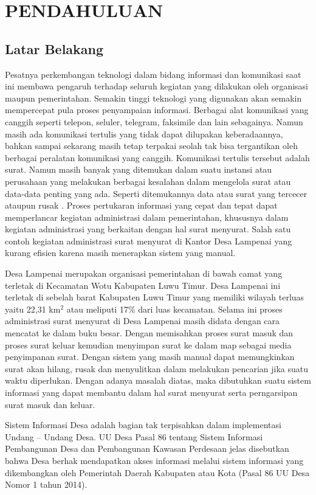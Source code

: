 \chapter{PENDAHULUAN}

\section{Latar Belakang}

Pesatnya perkembangan teknologi dalam bidang informasi dan komunikasi saat ini membawa pengaruh terhadap seluruh kegiatan yang dilakukan oleh organisasi maupun pemerintahan. Semakin tinggi teknologi yang digunakan akan semakin mempercepat pula proses penyampaian informasi. Berbagai alat komunikasi yang canggih seperti telepon, seluler, telegram, faksimile dan lain sebagainya. Namun masih ada komunikasi tertulis yang tidak dapat dilupakan keberadaannya, bahkan sampai sekarang masih tetap terpakai seolah tak bisa tergantikan oleh berbagai peralatan komunikasi yang canggih. Komunikasi tertulis tersebut adalah surat. Namun masih banyak yang ditemukan dalam suatu instansi atau perusahaan yang melakukan berbagai kesalahan dalam mengelola surat atau data-data penting yang ada. Seperti ditemukannya data atau surat yang tercecer ataupun rusak . Proses pertukaran informasi yang cepat dan tepat dapat memperlancar kegiatan administrasi dalam pemerintahan, khususnya dalam kegiatan administrasi yang berkaitan dengan hal surat menyurat. Salah satu contoh kegiatan administrasi surat menyurat di Kantor Desa Lampenai yang kurang efisien karena masih menerapkan sistem yang manual.

Desa Lampenai merupakan organisasi pemerintahan di bawah camat yang terletak di Kecamatan Wotu Kabupaten Luwu Timur. Desa Lampenai ini terletak di sebelah barat Kabupaten Luwu Timur yang memiliki wilayah terluas yaitu 22,31 km$^2$ atau meliputi 17\% dari luas kecamatan. Selama ini proses administrasi surat menyurat di Desa Lampenai masih didata dengan cara mencatat ke dalam buku besar. Dengan memisahkan proses surat masuk dan proses surat keluar kemudian menyimpan surat ke dalam map sebagai media penyimpanan surat. Dengan sistem yang masih manual dapat memungkinkan surat akan hilang, rusak dan menyulitkan dalam melakukan pencarian jika suatu waktu diperlukan. Dengan adanya masalah diatas, maka dibutuhkan suatu sistem informasi yang dapat membantu dalam hal surat menyurat serta perngarsipan surat masuk dan keluar.

Sistem Informasi Desa adalah bagian tak terpisahkan dalam implementasi Undang – Undang Desa. UU Desa Pasal 86 tentang Sistem Informasi Pembangunan Desa dan Pembangunan Kawasan Perdesaan jelas disebutkan bahwa Desa berhak mendapatkan akses informasi melalui sistem informasi yang dikembangkan oleh Pemerintah Daerah Kabupaten atau Kota (Pasal 86 UU Desa Nomor 1 tahun 2014).

